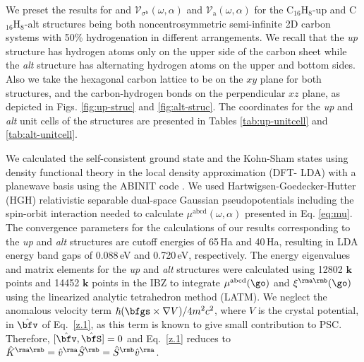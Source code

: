 \documentclass[prb,11pt,tightenlines,twocolumn,aps]{revtex4-1}
\begin{document}
We preset the results for 
and
$\mathcal{V}_{\sigma^{\mathrm{b}}}(\omega,\alpha)$ 
and
$\mathcal{V}_{\mathrm{a}}(\omega,\alpha)$ 
for the
C$_{16}$H$_{8}$-up  and C$_{16}$H$_{8}$-alt 
structures being both
noncentrosymmetric semi-infinite 2D carbon systems with 50\% hydrogenation in
different arrangements. We recall that the \emph{up} structure has hydrogen
atoms only on the upper side of the carbon sheet while the \emph{alt} structure
has alternating hydrogen atoms on the upper and bottom sides. Also we take the
hexagonal carbon lattice to be on the $xy$ plane for both structures, and the
carbon-hydrogen bonds on the perpendicular $xz$ plane, as depicted in Figs.
\ref{fig:up-struc} and \ref{fig:alt-struc}. The coordinates for the
\emph{up} and \emph{alt} unit cells of the structures are presented in Tables
\ref{tab:up-unitcell} and \ref{tab:alt-unitcell}. 

We calculated the self-consistent ground state and the Kohn-Sham
states using density functional theory in the local density approximation (DFT-
LDA) with a planewave basis using the ABINIT code \cite{gonzeCPC09}.
% 
We used Hartwigsen-Goedecker-Hutter (HGH) relativistic separable dual-space
Gaussian pseudopotentials \cite{hartwigsenPRB98} including the spin-orbit
interaction needed to calculate $\mu^{\mathrm{abcd}}(\omega,\alpha)$ presented
in Eq. \eqref{eq:mu}.
% 
The convergence parameters for the calculations of our results corresponding to
the \emph{up} and \emph{alt} structures are cutoff energies of 65\,Ha and
40\,Ha, resulting in LDA energy band gaps of 0.088\,eV and 0.720\,eV,
respectively. The energy eigenvalues and matrix elements for the \emph{up} and
\emph{alt} structures were calculated using 12802 $\mathbf{k}$ points and 14452
$\mathbf{k}$ points in the IBZ to integrate $\mu^{\mathrm{abcd}}(\go)$ 
and $\xi^{\rma\rmb}(\go)$ using the linearized analytic tetrahedron
method (LATM).\cite{nastosPRB07}
We neglect the
anomalous velocity term $\hbar(\bfgs\times\nabla V)/4m^2c^2$, 
where $V$ is the crystal potential, in 
 $\hat\bfv$ of Eq.~\eqref{z.1}, as this term is known to give
small contribution to PSC.\cite{bhatPRL05}
Therefore, $[\hat\bfv,\hat\bfS]=0$ and 
Eq.~\eqref{z.1} reduces to $\hat K^{\rma\rmb}=\hat v^\rma \hat
S^\rmb=\hat S^\rmb \hat v^\rma$. 


% 
\end{document}
